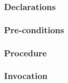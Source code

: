 \def\Subsubsection#1{\subsubsection{#1}}

\Subsubsection{Declarations}

\Subsubsection{Pre-conditions}

\Subsubsection{Procedure}

\Subsubsection{Invocation}
